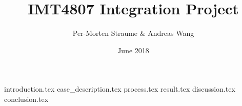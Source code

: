 \documentclass{article}
\title{IMT4807 Integration Project}
\author{Per-Morten Straume \& Andreas Wang}
\date{June 2018}
\begin{document}
\maketitle



{introduction.tex}
{case_description.tex}
{process.tex} %
{result.tex}
{discussion.tex}
{conclusion.tex}




\end{document}
